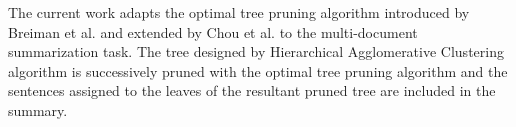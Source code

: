 The current work adapts the optimal tree pruning algorithm introduced by Breiman et al. and extended by Chou et al. to the multi-document summarization task.  The tree designed by Hierarchical Agglomerative Clustering algorithm is successively pruned with the optimal tree pruning algorithm and the sentences assigned to the leaves of the resultant pruned tree are included in the summary.
